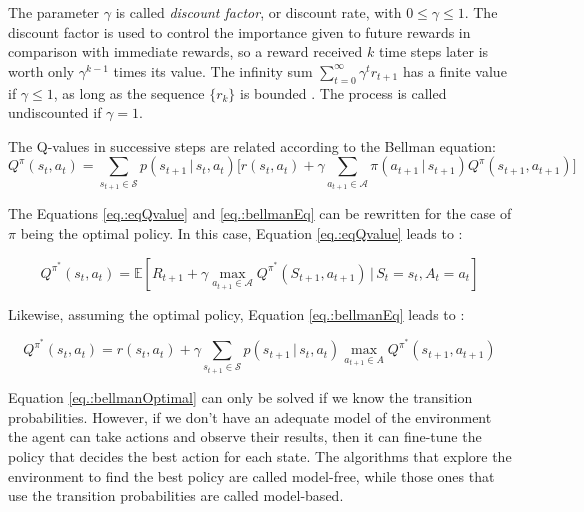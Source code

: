 The parameter $\gamma$ is called \textit{discount factor}, or discount rate, with $0 \leq \gamma \leq 1$.
%
The discount factor is used to control the importance given to future rewards in comparison with immediate rewards, so a reward received $k$ time steps later is worth only $\gamma^{k-1}$ times its value.
%
The infinity sum $\sum_{t=0}^{\infty} \gamma^{t} r_{t+1}$ has a finite value if $\gamma \leq 1$, as long as the sequence $\{r_k\}$ is bounded \cite{sutton2018rl}.
%
The process is called undiscounted if $\gamma=1$.


The Q-values in successive steps are related according to the Bellman equation:
\begin{equation} \label{eq.:bellmanEq}
    Q^{\pi}(s_t, a_t)= \sum_{s_{t+1} \in \mathcal{S}} p\left(s_{t+1} \, | \, s_t , a_t \right) \bigg[ r\left(s_t, a_t \right)  +
    \gamma \sum_{a_{t+1} \in \mathcal{A}} \pi\left(a_{t+1} \, | \, s_{t+1}\right) Q^{\pi}\left(s_{t+1}, a_{t+1}\right)  \bigg]
\end{equation}

The Equations \eqref{eq.:eqQvalue} and \ref{eq.:bellmanEq} can be rewritten for the case of $\pi$ being the optimal policy.
%
In this case, Equation \eqref{eq.:eqQvalue} leads to \cite{sutton2018rl}:

\begin{equation} \label{E_Optimal}
    Q^{\pi^*}\left(s_t, a_t\right)=\mathbb{E}\left[R_{t+1}+\gamma \max _{a_{t+1} \in \mathcal{A}} Q^{\pi^*}\left(S_{t+1}, a_{t+1}\right) \, | \, S_t=s_t, A_t=a_t\right]
\end{equation}

Likewise, assuming the optimal policy, Equation \eqref{eq.:bellmanEq} leads to \cite{DRL_AMC}:

\begin{equation} \label{eq.:bellmanOptimal}
    Q^{\pi^*}\left(s_t, a_t\right)=r(s_t,a_t)+ \gamma \sum_{s_{t+1} \in \mathcal{S}} p\left(s_{t+1} \, | \, s_t,a_t\right) \max _{a_{t+1} \in A} Q^{\pi^*}\left(s_{t+1}, a_{t+1}\right)
\end{equation}


Equation \eqref{eq.:bellmanOptimal} can only be solved if we know the transition probabilities.
%
However, if we don't have an adequate model of the environment the agent can take actions and observe their results, then it can fine-tune the policy that decides the best action for each state.
%
The algorithms that explore the environment to find the best policy are called model-free, while those ones that use the transition probabilities are called model-based.



